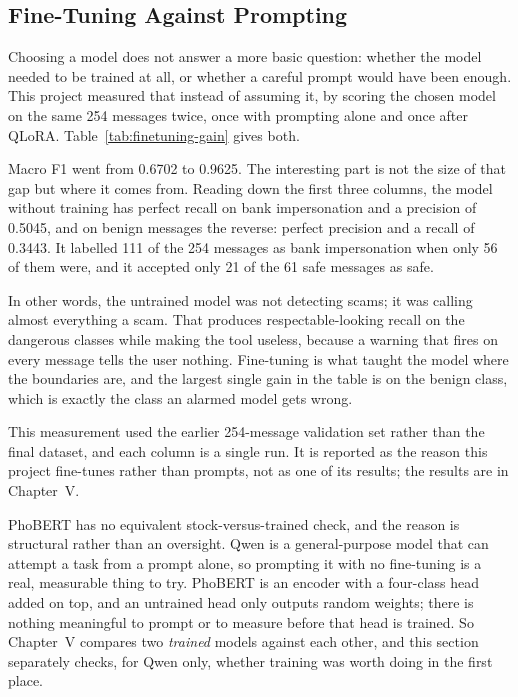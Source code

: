 \subsection{Fine-Tuning Against Prompting}
\label{sec:why-finetune}

Choosing a model does not answer a more basic question: whether the model needed to be trained at all, or whether a careful prompt would have been enough. This project measured that instead of assuming it, by scoring the chosen model on the same 254 messages twice, once with prompting alone and once after QLoRA. Table~\ref{tab:finetuning-gain} gives both.



\noindent Macro F1 went from 0.6702 to 0.9625. The interesting part is not the size of that gap but where it comes from. Reading down the first three columns, the model without training has perfect recall on bank impersonation and a precision of 0.5045, and on benign messages the reverse: perfect precision and a recall of 0.3443. It labelled 111 of the 254 messages as bank impersonation when only 56 of them were, and it accepted only 21 of the 61 safe messages as safe.

In other words, the untrained model was not detecting scams; it was calling almost everything a scam. That produces respectable-looking recall on the dangerous classes while making the tool useless, because a warning that fires on every message tells the user nothing. Fine-tuning is what taught the model where the boundaries are, and the largest single gain in the table is on the benign class, which is exactly the class an alarmed model gets wrong.

This measurement used the earlier 254-message validation set rather than the final dataset, and each column is a single run. It is reported as the reason this project fine-tunes rather than prompts, not as one of its results; the results are in Chapter~V.

PhoBERT has no equivalent stock-versus-trained check, and the reason is structural rather than an oversight. Qwen is a general-purpose model that can attempt a task from a prompt alone, so prompting it with no fine-tuning is a real, measurable thing to try. PhoBERT is an encoder with a four-class head added on top, and an untrained head only outputs random weights; there is nothing meaningful to prompt or to measure before that head is trained. So Chapter~V compares two \emph{trained} models against each other, and this section separately checks, for Qwen only, whether training was worth doing in the first place.

